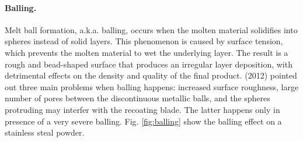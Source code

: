 \paragraph{Balling.} Melt ball formation, a.k.a. balling, occurs when the molten material solidifies into spheres instead of solid layers. This phenomenon is caused by surface tension, which prevents the molten material to wet the underlying layer. The result is a rough and bead-shaped surface that produces an irregular layer deposition, with detrimental effects on the density and quality of the final product. \citeauthor{li_balling_2012}(2012) pointed out three main problems when balling happens: increased surface roughness, large number of pores between the discontinuous metallic balls, and the spheres protruding may interfer with the recoating blade. The latter happens only in presence of a very severe balling. Fig. \ref{fig:balling} show the balling effect on a stainless steal powder.
